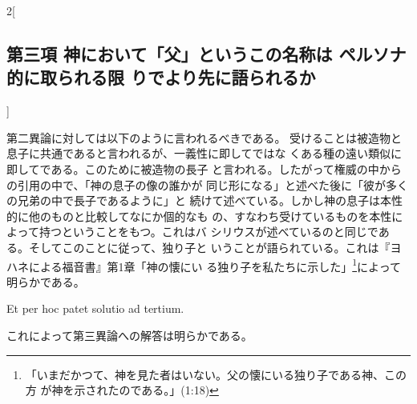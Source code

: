 \documentclass[paper=a4paper,fontsize=10pt,jafontsize=9pt,titlepage]{jlreq}
\begin{document}
\begin{paracol}{2}[\subsection{第三項 神において「父」というこの名称は ペルソナ的に取られる限 りでより先に語られるか}]
\switchcolumn


第二異論に対しては以下のように言われるべきである。
受けることは被造物と息子に共通であると言われるが、一義性に即してではな
 くある種の遠い類似に即してである。このために被造物の長子
と言われる。したがって権威の中からの引用の中で、「神の息子の像の誰かが
 同じ形になる」と述べた後に「彼が多くの兄弟の中で長子であるように」と
 続けて述べている。しかし神の息子は本性的に他のものと比較してなにか個的なも
 の、すなわち受けているものを本性によって持つということをもつ。これはバ
 シリウスが述べているのと同じである。そしてこのことに従って、独り子と
 いうことが語られている。これは『ヨハネによる福音書』第1章「神の懐にい
 る独り子を私たちに示した」\footnote{「いまだかつて、神を見た者はいない。父の懐にいる独り子である神、この方
 が神を示されたのである。」(1:18)}によって明らかである。


\switchcolumn*


Et per hoc patet solutio ad tertium.


\switchcolumn


これによって第三異論への解答は明らかである。


\switchcolumn*



\end{paracol}
\newpage


\end{document}
